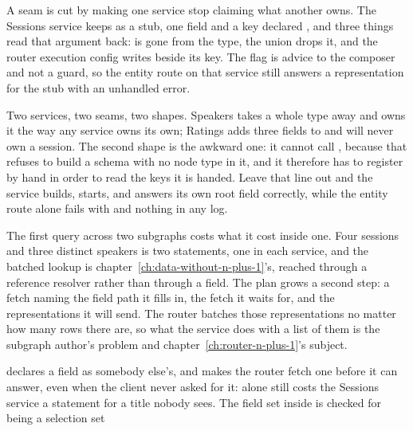 \begin{chaptersummary}
  \item A seam is cut by making one service stop claiming what another owns.
        The Sessions service keeps  as a stub, one field and a
        key declared , and three things read that
        argument back:  is gone from the type, the
         union drops it, and the router execution config writes
         beside its key. The flag is advice to the
        composer and not a guard, so the entity route on that service still
        answers a representation for the stub with an unhandled error.
  \item Two services, two seams, two shapes. Speakers takes a whole type away
        and owns it the way any service owns its own; Ratings adds three fields
        to  and will never own a session. The second shape is the
        awkward one: it cannot call
        , because that refuses to build a
        schema with no node type in it, and it therefore has to register
         by hand in order to read the keys
        it is handed. Leave that line out and the service builds, starts, and
        answers its own root field correctly, while the entity route alone
        fails with  and nothing in any log.
  \item The first query across two subgraphs costs what it cost inside one.
        Four sessions and three distinct speakers is two statements, one in
        each service, and the batched lookup is
        chapter~\ref{ch:data-without-n-plus-1}'s, reached through a reference
        resolver rather than through a field. The plan grows a second step: a
         fetch naming the field path it fills in, the fetch it
        waits for, and the representations it will send. The router batches
        those representations no matter how many rows there are, so what the
        service does with a list of them is the subgraph author's problem and
        chapter~\ref{ch:router-n-plus-1}'s subject.
  \item {} declares a field as somebody else's, and
         makes the router fetch one before it can answer, even
        when the client never asked for it:  alone still
        costs the Sessions service a statement for a title nobody sees. The
        field set inside  is checked for being a selection set

\end{chaptersummary}
